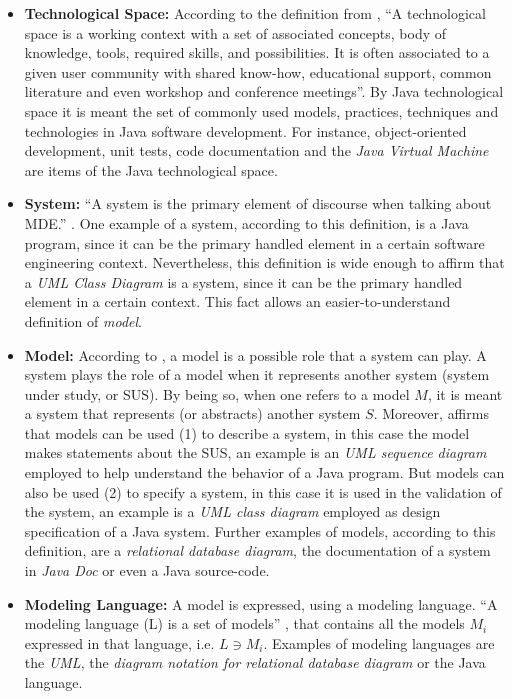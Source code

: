 \documentclass[tuberlin,cic,tc,english,noabntcite, oneside]{iiufrgs}
\begin{document}
\begin{itemize}
	\item \textbf{Technological Space:} According to the definition from \citet[p. 1]{kurtev2002technological}, \enquote{A technological space is a working context with a set of associated concepts, body of knowledge, tools, required skills, and possibilities. It is often associated to a given user community with shared know-how, educational support, common literature and even workshop and conference meetings}. By Java technological space it is meant the set of commonly used models, practices, techniques and technologies in Java software development. For instance, object-oriented development, unit tests, code documentation and the \emph{Java Virtual Machine} are items of the Java technological space.

	\item \textbf{System:} \enquote{A system is the primary element of discourse when talking about MDE.} \citep[p. 13]{favre2004foundations}. One example of a system, according to this definition, is a Java program, since it can be the primary handled element in a certain software engineering context. Nevertheless, this definition is wide enough to affirm that a \emph{UML Class Diagram} is a system, since it can be the primary handled element in a certain context. This fact allows an easier-to-understand definition of \emph{model}.

	\item \textbf{Model:} According to \citet{favre2004foundations}, a model is a possible role that a system can play. A system plays the role of a model when it represents another system (system under study, or SUS). By being so, when one refers to a model $M$, it is meant a system that represents (or abstracts) another system $S$. Moreover, \citet{seidewitz2003models} affirms that models can be used (1) to describe a system, in this case the model makes statements about the SUS, an example is an \emph{UML sequence diagram} employed to help understand the behavior of a Java program. But models can also be used (2) to specify a system, in this case it is used in the validation of the system, an example is a \emph{UML class diagram} employed as design specification of a Java system. Further examples of models, according to this definition, are a \emph{relational database diagram}, the documentation of a system in \emph{Java Doc} or even a Java source-code.

	\item \textbf{Modeling Language:} A model is expressed, using a modeling language. \enquote{A modeling language (L) is a set of models} \citep[p. 13]{favre2004foundations}, that contains all the models $M_i$ expressed in that language, i.e. $L \owns M_i$. Examples of modeling languages are the \emph{UML}, the \emph{diagram notation for relational database diagram} or the Java language.


\end{itemize}
\end{document}
